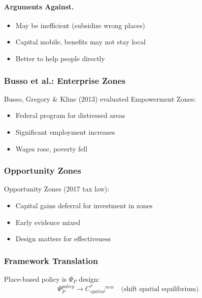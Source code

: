 \paragraph{Arguments Against.}
\begin{itemize}
    \item May be inefficient (subsidize wrong places)
    \item Capital mobile, benefits may not stay local
    \item Better to help people directly
\end{itemize}

\subsubsection{Busso et al.: Enterprise Zones}

Busso, Gregory \& Kline (2013) evaluated Empowerment Zones:
\begin{itemize}
    \item Federal program for distressed areas
    \item Significant employment increases
    \item Wages rose, poverty fell
\end{itemize}

\subsubsection{Opportunity Zones}

Opportunity Zones (2017 tax law):
\begin{itemize}
    \item Capital gains deferral for investment in zones
    \item Early evidence mixed
    \item Design matters for effectiveness
\end{itemize}

\subsubsection{Framework Translation}

Place-based policy is $\Psi_P$ design:
\begin{equation}
\Psi_P^{policy} \to C^*_{spatial}^{new} \quad \text{(shift spatial equilibrium)}
\end{equation}

